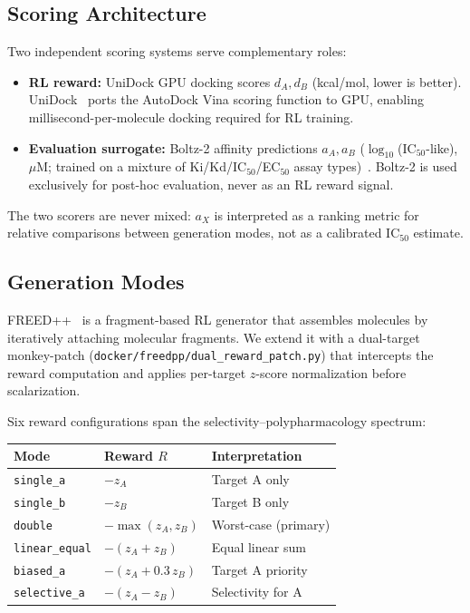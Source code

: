 
\subsection{Scoring Architecture}
\label{sec:methods:scoring}

Two independent scoring systems serve complementary roles:
\begin{itemize}
\item \textbf{RL reward:} UniDock GPU docking scores
  $d_A, d_B$ (kcal/mol, lower is better).  UniDock~\citep{yu2023unidock}
  ports the AutoDock Vina scoring function to GPU, enabling
  millisecond-per-molecule docking required for RL training.
\item \textbf{Evaluation surrogate:} Boltz-2 affinity predictions
  $a_A, a_B$ ($\log_{10}$(IC$_{50}$-like), $\mu$M; trained on a
  mixture of Ki/Kd/IC$_{50}$/EC$_{50}$ assay
  types)~\citep{passaro2025boltz2}.
  Boltz-2 is used exclusively for post-hoc evaluation, never as
  an RL reward signal.
\end{itemize}
The two scorers are never mixed: $a_X$ is interpreted as a
ranking metric for relative comparisons between generation modes,
not as a calibrated IC$_{50}$ estimate.

\subsection{Generation Modes}
\label{sec:methods:modes}

FREED++~\citep{telepov2023freedpp} is a fragment-based RL generator
that assembles molecules by iteratively attaching molecular fragments.
We extend it with a dual-target monkey-patch
(\texttt{docker/freedpp/dual\_reward\_patch.py}) that intercepts
the reward computation and applies per-target $z$-score
normalization before scalarization.

Six reward configurations span the selectivity--polypharmacology
spectrum:

\begin{center}
\begin{tabular}{lll}
\toprule
Mode & Reward $R$ & Interpretation \\
\midrule
\texttt{single\_a}     & $-z_A$                & Target A only \\
\texttt{single\_b}     & $-z_B$                & Target B only \\
\texttt{double}        & $-\max(z_A, z_B)$     & Worst-case (primary) \\
\texttt{linear\_equal} & $-(z_A + z_B)$        & Equal linear sum \\
\texttt{biased\_a}     & $-(z_A + 0.3\,z_B)$  & Target A priority \\
\texttt{selective\_a}  & $-(z_A - z_B)$        & Selectivity for A \\
\bottomrule
\end{tabular}
\end{center}

